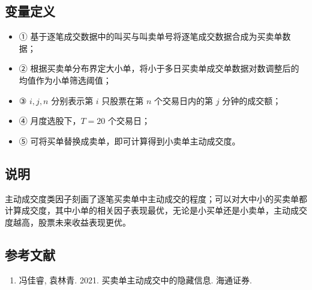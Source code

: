 \documentclass{article}
\begin{document}
\subsection{变量定义}
\begin{itemize}
    \item ① 基于逐笔成交数据中的叫买与叫卖单号将逐笔成交数据合成为买卖单数据；
    \item ② 根据买卖单分布界定大小单，将小于多日买卖单成交单数据对数调整后的均值作为小单筛选阈值；
    \item ③ \( i, j, n \) 分别表示第 \( i \) 只股票在第 \( n \) 个交易日内的第 \( j \) 分钟的成交额；
    \item ④ 月度选股下，\( T=20 \) 个交易日；
    \item ⑤ 可将买单替换成卖单，即可计算得到小卖单主动成交度。
\end{itemize}

\subsection{说明}
主动成交度类因子刻画了逐笔买卖单中主动成交的程度；可以对大中小的买卖单都计算成交度，其中小单的相关因子表现最优，无论是小买单还是小卖单，主动成交度越高，股票未来收益表现更优。

\subsection{参考文献}
\begin{enumerate}
    \item 冯佳睿, 袁林青. 2021. 买卖单主动成交中的隐藏信息. 海通证券.
\end{enumerate}
\end{document}
